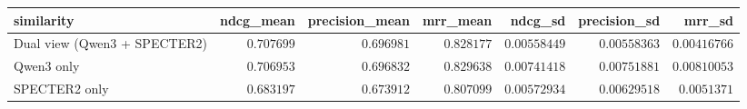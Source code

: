 \begin{tabular}{lrrrrrr}
\toprule
similarity & ndcg\_mean & precision\_mean & mrr\_mean & ndcg\_sd & precision\_sd & mrr\_sd \\
\midrule
Dual view (Qwen3 + SPECTER2) & $0.707699$ & $0.696981$ & $0.828177$ & $0.00558449$ & $0.00558363$ & $0.00416766$ \\
Qwen3 only & $0.706953$ & $0.696832$ & $0.829638$ & $0.00741418$ & $0.00751881$ & $0.00810053$ \\
SPECTER2 only & $0.683197$ & $0.673912$ & $0.807099$ & $0.00572934$ & $0.00629518$ & $0.0051371$ \\
\bottomrule
\end{tabular}

